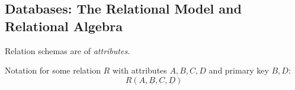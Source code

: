\subsection{Databases: The Relational Model and Relational Algebra}%
\label{sub:relational-algebra}

\begin{multicols}{2}






    \begin{CheatsheetEntryFrame}


        Relation schemas are  of \textit{attributes}.

        Notation for some relation $R$ with attributes $A, B, C, D$ and primary key $B, D$:
        \begin{equation*}
            R(A, \underline{B}, C, \underline{D})
        \end{equation*}


\end{CheatsheetEntryFrame}
\end{multicols}
